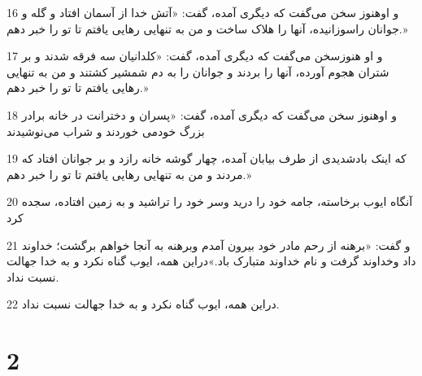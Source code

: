 \par 16 و اوهنوز سخن می‌گفت که دیگری آمده، گفت: «آتش خدا از آسمان افتاد و گله و جوانان راسوزانیده، آنها را هلاک ساخت و من به تنهایی رهایی یافتم تا تو را خبر دهم.»
\par 17 و او هنوزسخن می‌گفت که دیگری آمده، گفت: «کلدانیان سه فرقه شدند و بر شتران هجوم آورده، آنها را بردند و جوانان را به دم شمشیر کشتند و من به تنهایی رهایی یافتم تا تو را خبر دهم.»
\par 18 و اوهنوز سخن می‌گفت که دیگری آمده، گفت: «پسران و دخترانت در خانه برادر بزرگ خودمی خوردند و شراب می‌نوشیدند
\par 19 که اینک بادشدیدی از طرف بیابان آمده، چهار گوشه خانه رازد و بر جوانان افتاد که مردند و من به تنهایی رهایی یافتم تا تو را خبر دهم.»
\par 20 آنگاه ایوب برخاسته، جامه خود را درید وسر خود را تراشید و به زمین افتاده، سجده کرد
\par 21 و گفت: «برهنه از رحم مادر خود بیرون آمدم وبرهنه به آنجا خواهم برگشت؛ خداوند داد وخداوند گرفت و نام خداوند متبارک باد.»دراین همه، ایوب گناه نکرد و به خدا جهالت نسبت نداد.
\par 22 دراین همه، ایوب گناه نکرد و به خدا جهالت نسبت نداد.
 
\chapter{2}

